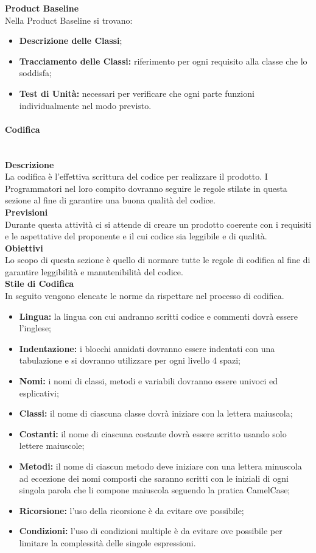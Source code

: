 \textbf{Product Baseline}\\
Nella Product Baseline si trovano:
\begin{itemize}
	\item \textbf{Descrizione delle Classi};
	\item \textbf{Tracciamento delle Classi:} riferimento per ogni requisito alla classe che lo soddisfa;
	\item \textbf{Test di Unità:} necessari per verificare che ogni parte funzioni individualmente nel modo previsto.
\end{itemize}
\paragraph{Codifica} \mbox{}
\\\textbf{Descrizione}\\
La codifica è l'effettiva scrittura del codice per realizzare il prodotto. I Programmatori nel loro compito dovranno seguire le regole stilate in questa sezione al fine di garantire una buona qualità del codice.
\\\textbf{Previsioni}\\
Durante questa attività ci si attende di creare un prodotto coerente con i requisiti e le aspettative del proponente e il cui codice sia leggibile e di qualità.
\\\textbf{Obiettivi}\\
Lo scopo di questa sezione è quello di normare tutte le regole di codifica al fine di garantire leggibilità e manutenibilità del codice.
\\\textbf{Stile di Codifica}\\
In seguito vengono elencate le norme da rispettare nel processo di codifica.
\begin{itemize}
	\item \textbf{Lingua:} la lingua con cui andranno scritti codice e commenti dovrà essere l'inglese;
	\item \textbf{Indentazione:} i blocchi annidati dovranno essere indentati con una tabulazione e si dovranno utilizzare per ogni livello 4 spazi;
	\item \textbf{Nomi:} i nomi di classi, metodi e variabili dovranno essere univoci ed esplicativi;
	\item \textbf{Classi:} il nome di ciascuna classe dovrà iniziare con la lettera maiuscola; 
	\item \textbf{Costanti:} il nome di ciascuna costante dovrà essere scritto usando solo lettere maiuscole;
	\item \textbf{Metodi:} il nome di ciascun metodo deve iniziare con una lettera minuscola ad eccezione dei nomi composti che saranno scritti con le iniziali di ogni singola parola che li compone maiuscola seguendo la pratica CamelCase;
	\item \textbf{Ricorsione:} l'uso della ricorsione è da evitare ove possibile;
	\item \textbf{Condizioni:} l'uso di condizioni multiple è da evitare ove possibile per limitare la complessità delle singole espressioni\glo.
\end{itemize}
